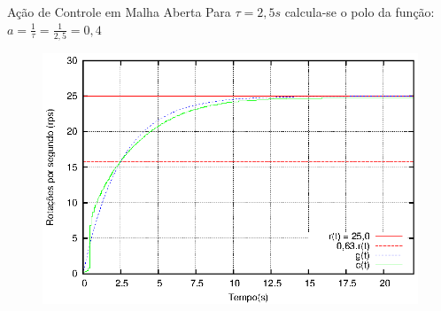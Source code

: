 \begin{frame}{Ação de Controle em Malha Aberta}
Para $\tau = 2,5s $ calcula-se o polo da função:
$  a = \frac{1}{\tau} = \frac{1}{2,5} = 0,4 $
\vspace{-0.5cm}
\begin{figure}[!htb]
\center\includegraphics[scale=0.9]{./imagens/acaoMalhaAbertaTau.eps}
\label{fig:acaoMalhaAberTau}

\end{figure}


\end{frame}


